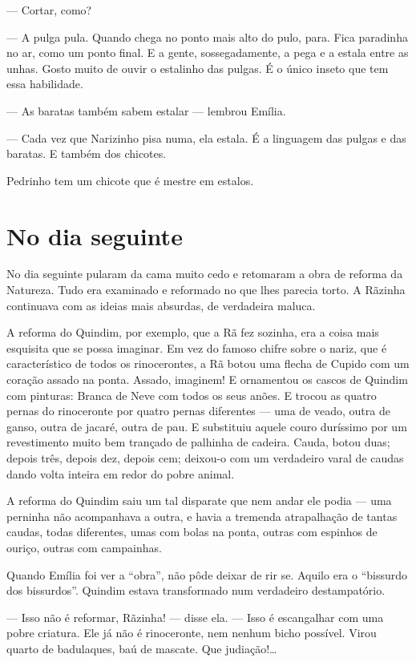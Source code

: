 --- Cortar, como?

--- A pulga pula. Quando chega no ponto mais alto do pulo, para. Fica
paradinha no ar, como um ponto final. E a gente, sossegadamente, a pega
e a estala entre as unhas. Gosto muito de ouvir o estalinho das pulgas.
É o único inseto que tem essa habilidade.

--- As baratas também sabem estalar --- lembrou Emília.

--- Cada vez que Narizinho pisa numa, ela estala. É a linguagem das
pulgas e das baratas. E também dos chicotes.

Pedrinho tem um chicote que é mestre em estalos.


\chapter{No dia seguinte}

No dia seguinte pularam da cama muito cedo e retomaram a obra de reforma
da Natureza. Tudo era examinado e reformado no que lhes parecia torto. A
Rãzinha continuava com as ideias mais absurdas, de verdadeira maluca.

A reforma do Quindim, por exemplo, que a Rã fez sozinha, era a coisa
mais esquisita que se possa imaginar. Em vez do famoso chifre sobre o
nariz, que é característico de todos os rinocerontes, a Rã botou uma
flecha de Cupido com um coração assado na ponta. Assado, imaginem! E
ornamentou os cascos de Quindim com pinturas: Branca de Neve com todos
os seus anões. E trocou as quatro pernas do rinoceronte por quatro
pernas diferentes --- uma de veado, outra de ganso, outra de jacaré,
outra de pau. E substituiu aquele couro duríssimo por um revestimento
muito bem trançado de palhinha de cadeira. Cauda, botou duas; depois
três, depois dez, depois cem; deixou-o com um verdadeiro varal de caudas
dando volta inteira em redor do pobre animal.

A reforma do Quindim saiu um tal disparate que nem andar ele podia ---
uma perninha não acompanhava a outra, e havia a tremenda atrapalhação de
tantas caudas, todas diferentes, umas com bolas na ponta, outras com
espinhos de ouriço, outras com campainhas.

Quando Emília foi ver a ``obra'', não pôde deixar de rir se. Aquilo era
o ``bissurdo dos bissurdos''. Quindim estava transformado num verdadeiro
destampatório.

--- Isso não é reformar, Rãzinha! --- disse ela. --- Isso é escangalhar
com uma pobre criatura. Ele já não é rinoceronte, nem nenhum bicho
possível. Virou quarto de badulaques, baú de mascate. Que
judiação!\ldots{}

